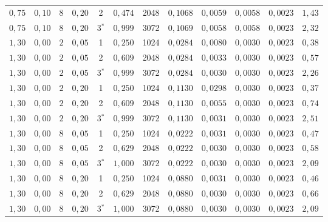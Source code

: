 \begin{tabular}{cccccccccccc}
$0{,}75$ & $0{,}10$ & $8$ & $0{,}20$ & 2 & $0{,}474$ & 2048 & $0{,}1068$ & $0{,}0059$ & $0{,}0058$ & $0{,}0023$ & $1{,}43$ \\
$0{,}75$ & $0{,}10$ & $8$ & $0{,}20$ & 3$^*$ & $0{,}999$ & 3072 & $0{,}1069$ & $0{,}0058$ & $0{,}0058$ & $0{,}0023$ & $2{,}32$ \\
\midrule
$1{,}30$ & $0{,}00$ & $2$ & $0{,}05$ & 1 & $0{,}250$ & 1024 & $0{,}0284$ & $0{,}0080$ & $0{,}0030$ & $0{,}0023$ & $0{,}38$ \\
$1{,}30$ & $0{,}00$ & $2$ & $0{,}05$ & 2 & $0{,}609$ & 2048 & $0{,}0284$ & $0{,}0033$ & $0{,}0030$ & $0{,}0023$ & $0{,}57$ \\
$1{,}30$ & $0{,}00$ & $2$ & $0{,}05$ & 3$^*$ & $0{,}999$ & 3072 & $0{,}0284$ & $0{,}0030$ & $0{,}0030$ & $0{,}0023$ & $2{,}26$ \\
$1{,}30$ & $0{,}00$ & $2$ & $0{,}20$ & 1 & $0{,}250$ & 1024 & $0{,}1130$ & $0{,}0298$ & $0{,}0030$ & $0{,}0023$ & $0{,}37$ \\
$1{,}30$ & $0{,}00$ & $2$ & $0{,}20$ & 2 & $0{,}609$ & 2048 & $0{,}1130$ & $0{,}0055$ & $0{,}0030$ & $0{,}0023$ & $0{,}74$ \\
$1{,}30$ & $0{,}00$ & $2$ & $0{,}20$ & 3$^*$ & $0{,}999$ & 3072 & $0{,}1130$ & $0{,}0031$ & $0{,}0030$ & $0{,}0023$ & $2{,}51$ \\
$1{,}30$ & $0{,}00$ & $8$ & $0{,}05$ & 1 & $0{,}250$ & 1024 & $0{,}0222$ & $0{,}0031$ & $0{,}0030$ & $0{,}0023$ & $0{,}47$ \\
$1{,}30$ & $0{,}00$ & $8$ & $0{,}05$ & 2 & $0{,}629$ & 2048 & $0{,}0222$ & $0{,}0030$ & $0{,}0030$ & $0{,}0023$ & $0{,}58$ \\
$1{,}30$ & $0{,}00$ & $8$ & $0{,}05$ & 3$^*$ & $1{,}000$ & 3072 & $0{,}0222$ & $0{,}0030$ & $0{,}0030$ & $0{,}0023$ & $2{,}09$ \\
$1{,}30$ & $0{,}00$ & $8$ & $0{,}20$ & 1 & $0{,}250$ & 1024 & $0{,}0880$ & $0{,}0031$ & $0{,}0030$ & $0{,}0023$ & $0{,}46$ \\
$1{,}30$ & $0{,}00$ & $8$ & $0{,}20$ & 2 & $0{,}629$ & 2048 & $0{,}0880$ & $0{,}0030$ & $0{,}0030$ & $0{,}0023$ & $0{,}66$ \\
$1{,}30$ & $0{,}00$ & $8$ & $0{,}20$ & 3$^*$ & $1{,}000$ & 3072 & $0{,}0880$ & $0{,}0030$ & $0{,}0030$ & $0{,}0023$ & $2{,}09$ \\
\bottomrule
\end{tabular}

